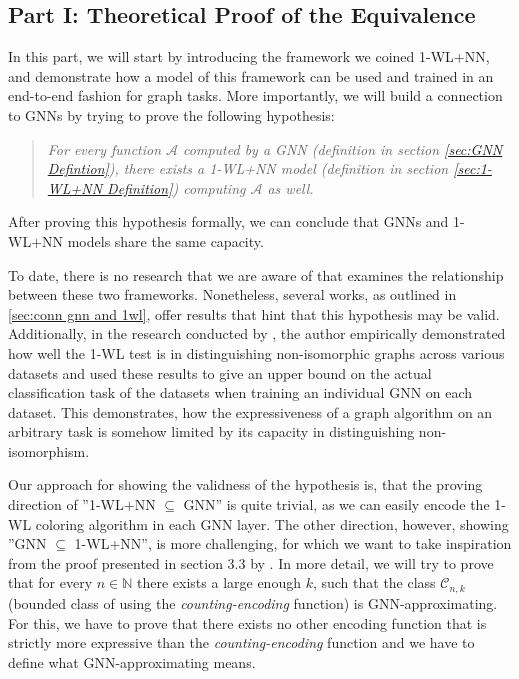 \documentclass[11pt, dvipsnames, DIV=12]{scrreprt}
\theoremstyle{definition}
\newcommand{\Nb}{\mathbb{N}}
\newcommand{\wlnn}{\text{1-WL+NN }}
\begin{document}
\subsection{Part I: Theoretical Proof of the Equivalence}
In this part, we will start by introducing the framework we coined 1-WL+NN, and demonstrate how a model of this framework can be used and trained in an end-to-end fashion for graph tasks. More importantly, we will build a connection to GNNs by trying to prove the following hypothesis:

\begin{quote}
\textit{
    For every function $\mathcal{A}$ computed by a GNN (definition in section \ref{sec:GNN Defintion}), there exists a 1-WL+NN model (definition in section \ref{sec:1-WL+NN Definition}) computing $\mathcal{A}$ as well.
}
\end{quote}
After proving this hypothesis formally, we can conclude that GNNs and 1-WL+NN models share the same capacity.

To date, there is no research that we are aware of that examines the relationship between these two
frameworks. Nonetheless, several works, as outlined in \ref{sec:conn gnn and 1wl}, offer results that hint that this hypothesis may be valid.  Additionally, in the research conducted by \cite{Zopf2022}, the author empirically demonstrated how well the 1-WL test is in distinguishing non-isomorphic graphs across various datasets and used these results to give an upper bound on the actual classification task of the datasets when training an individual GNN on each dataset. This demonstrates, how the expressiveness of a graph algorithm on an arbitrary task is somehow limited by its capacity in distinguishing non-isomorphism.

Our approach for showing the validness of the hypothesis is, that the proving direction of ''1-WL+NN $\subseteq$ GNN'' is quite trivial, as we can easily encode the 1-WL coloring algorithm in each GNN layer. The other direction, however, showing ''GNN $\subseteq$ 1-WL+NN'', is more challenging, for which we want to take inspiration from the proof presented in section 3.3 by \cite{Xu2018}. In more detail, we will try to prove that for every $n \in \Nb$ there exists a large enough $k$, such that the class $\mathcal{C}_{n,k}$ (bounded class of \wlnn using the \emph{counting-encoding} function) is GNN-approximating. For this, we have to prove that there exists no other encoding function that is strictly more expressive than the \emph{counting-encoding} function and we have to define what GNN-approximating means.
\end{document}
